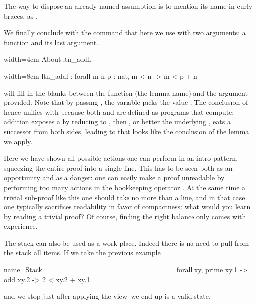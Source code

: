The way to dispose an already named assumption is to mention
its name in curly braces, as .

We finally conclude with the  command that here we use
with two arguments: a function and its last argument.

\begin{coq}{}{width=4cm}
About ltn_addl.
\end{coq}
\begin{coqout}{}{width=8cm}
ltn_addl : forall m n p : nat, m < n -> m < p + n
\end{coqout}

 will fill in the blanks between the function (the lemma name)
and the argument provided.  Note that by passing , the
variable  picks the value .  The conclusion of 
hence unifies with  because both \C{+} and \C{<} are
defined as programs that compute: addition exposes a  by
reducing to , then \C{<}, or better the underlying
\C{<=}, eats a successor from both sides, leading to 
that looks like the conclusion of the lemma we apply.

Here we have shown all possible actions one can perform in an intro
pattern, squeezing the entire proof into a single line.  This has
to be seen both as an opportunity and as a danger: one can easily
make a proof unreadable by performing too many actions in the bookkeeping
operator \C{=>}.  At the same time a trivial sub-proof like this one
should take no more than a line, and in that case one typically
sacrifices readability in favor of compactness: what would you learn by
reading a trivial proof?  Of course,
finding the right balance only comes with experience.




The stack can also be used as a work place.  Indeed there is
no need to pull from the stack all items.  If we take the previous example

\begin{coqout}{name=Stack}{}
========================
forall xy, prime xy.1 -> odd xy.2 -> 2 < xy.2 + xy.1
\end{coqout}
and we stop just after applying the view, we end up is a valid state.

